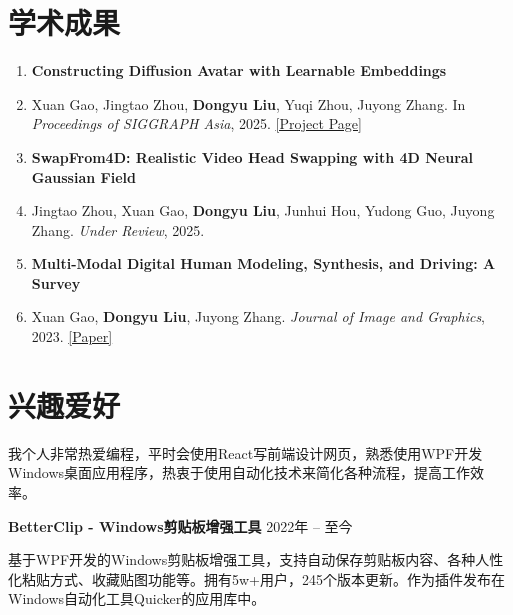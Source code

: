 \documentclass[11pt,a4paper]{ctexart}
\begin{document}
\section{学术成果}
\begin{enumerate}[leftmargin=0.15in, label={}, itemsep=-2pt, parsep=0pt]
\item \textbf{Constructing Diffusion Avatar with Learnable Embeddings}
\item Xuan Gao, Jingtao Zhou, \textbf{Dongyu Liu}, Yuqi Zhou, Juyong Zhang. In \textit{Proceedings of SIGGRAPH Asia}, 2025. \href{https://ustc3dv.github.io/Learn2Control/}{[Project Page]}

\item \textbf{SwapFrom4D: Realistic Video Head Swapping with 4D Neural Gaussian Field}
\item Jingtao Zhou, Xuan Gao, \textbf{Dongyu Liu}, Junhui Hou, Yudong Guo, Juyong Zhang. \textit{Under Review}, 2025.

\item \textbf{Multi-Modal Digital Human Modeling, Synthesis, and Driving: A Survey}
\item Xuan Gao, \textbf{Dongyu Liu}, Juyong Zhang. \textit{Journal of Image and Graphics}, 2023. \href{https://www.cjig.cn/zh/article/doi/10.11834/jig.230649/}{[Paper]}
\end{enumerate}


\section{兴趣爱好}

我个人非常热爱编程，平时会使用React写前端设计网页，熟悉使用WPF开发Windows桌面应用程序，热衷于使用自动化技术来简化各种流程，提高工作效率。

\textbf{BetterClip - Windows剪贴板增强工具} \hfill 2022年 -- 至今

基于WPF开发的Windows剪贴板增强工具，支持自动保存剪贴板内容、各种人性化粘贴方式、收藏贴图功能等。拥有5w+用户，245个版本更新。作为插件发布在Windows自动化工具Quicker的应用库中。
\end{document}
